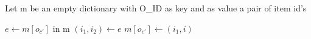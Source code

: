 \documentclass[12pt]{article}
\begin{document}
Let m be an empty dictionary with O_ID as key and as value a pair of item id's
\begin{algorithmic}
   \State $e\gets m[o_{c'}]$
   \State {} in m
   \Else
   \State $(i_{1},i_{2})\gets e$
      \State $m[o_{c'}]\gets (i_{1},i)$ 			  
      \State {}
   \EndIf
   \EndIf
   \EndFor
   \EndFor
   \EndFor
\end{algorithmic}
\end{document}
